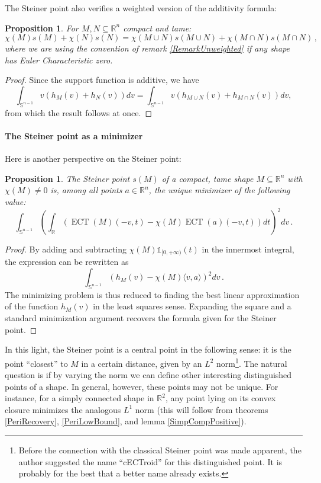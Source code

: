 \documentclass[a4paper]{article}
\newtheorem{prop}[theorem]{Proposition}
\newcommand{\ECT}{\operatorname{ECT}}
\newcommand{\bb}{\mathbb}
\begin{document}
The Steiner point also verifies a weighted version of the additivity formula:

\begin{prop}
	\label{SteinerWeightAdd}
	For $M,N\subseteq \bb R^n$ compact and tame:
	\[ \chi(M)s(M)+\chi(N)s(N)=\chi(M \cup N)s(M \cup N)+\chi(M \cap N)s(M \cap N)\, ,\]
	where we are using the convention of remark \ref{RemarkUnweighted} if any shape has Euler Characteristic zero.
\end{prop}

\begin{proof}
	Since the support function is additive, we have \[\int_{\bb S^{n-1}} v (h_M(v)+h_N(v)) dv=\int_{\bb S^{n-1}} v (h_{M \cup N}(v)+h_{M \cap N}(v)) dv,\] from which the result follows at once.
\end{proof}


\paragraph{The Steiner point as a minimizer}
Here is another perspective on the Steiner point:

\begin{prop}
	\label{SteinerMinimizer}
	The Steiner point $s(M)$ of a compact, tame shape $M\subseteq \bb R^n$ with $\chi(M) \neq 0$ is, among all points $a\in \bb R^n$, the unique minimizer of the following value:
	\[ \int_{\bb S^{n-1}} \left( \int_{\bb R} (\ECT(M)(-v,t)-\chi(M)\ECT(a)(-v,t)) dt\right)^2 dv\, .\]
\end{prop}

\begin{proof}
	By adding and subtracting $\chi(M)\bb 1_{[0,+\infty)}(t)$ in the innermost integral, the expression can be rewritten as $$\int_{\bb S^{n-1}}(h_M(v)-\chi(M) \langle v,a \rangle)^2 dv\, .$$ The minimizing problem is thus reduced to finding the best linear approximation of the function $h_M(v)$ in the least squares sense. Expanding the square and a standard minimization argument recovers the formula given for the Steiner point.
\end{proof}
In this light, the Steiner point is a central point in the following sense: it is the point ``closest'' to $M$ in a certain distance, given by an $L^2$ norm\footnote{Before the connection with the classical Steiner point was made apparent, the author suggested the name ``cECTroid'' for this distinguished point. It is probably for the best that a better name already exists.}. The natural question is if by varying the norm we can define other interesting distinguished points of a shape. In general, however, these points may not be unique. For instance, for a simply connected shape in $\bb R^2$, any point lying on its convex closure minimizes the analogous $L^1$ norm (this will follow from theorems \ref{PeriRecovery}, \ref{PeriLowBound}, and  lemma \ref{SimpCompPositive}). 
\end{document}
